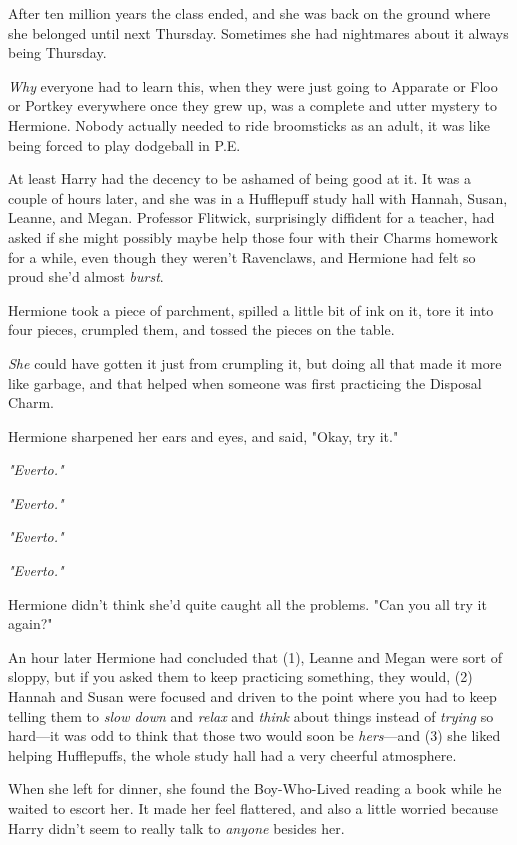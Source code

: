 After ten million years the class ended, and she was back on the ground where
she belonged until next Thursday. Sometimes she had nightmares about it always
being Thursday.

\emph{Why} everyone had to learn this, when they were just going to Apparate or
Floo or Portkey everywhere once they grew up, was a complete and utter mystery
to Hermione. Nobody actually needed to ride broomsticks as an adult, it was
like being forced to play dodgeball in P.E.

At least Harry had the decency to be ashamed of being good at it.
\sbreak
It was a couple of hours later, and she was in a Hufflepuff study hall with
Hannah, Susan, Leanne, and Megan. Professor Flitwick, surprisingly diffident
for a teacher, had asked if she might possibly maybe help those four with their
Charms homework for a while, even though they weren't Ravenclaws, and Hermione
had felt so proud she'd almost \emph{burst}.

Hermione took a piece of parchment, spilled a little bit of ink on it, tore it
into four pieces, crumpled them, and tossed the pieces on the table.

\emph{She} could have gotten it just from crumpling it, but doing all that made
it more like garbage, and that helped when someone was first practicing the
Disposal Charm.

Hermione sharpened her ears and eyes, and said, "Okay, try it."

\emph{"Everto."}

\emph{"Everto."}

\emph{"Everto."}

\emph{"Everto."}

Hermione didn't think she'd quite caught all the problems. "Can you all try it
again?"

An hour later Hermione had concluded that (1), Leanne and Megan were sort of
sloppy, but if you asked them to keep practicing something, they would, (2)
Hannah and Susan were focused and driven to the point where you had to keep
telling them to \emph{slow down} and \emph{relax} and \emph{think} about things
instead of \emph{trying} so hard---it was odd to think that those two would
soon be \emph{hers}---and (3) she liked helping Hufflepuffs, the whole study
hall had a very cheerful atmosphere.

When she left for dinner, she found the Boy-Who-Lived reading a book while he
waited to escort her. It made her feel flattered, and also a little worried
because Harry didn't seem to really talk to \emph{anyone} besides her.

